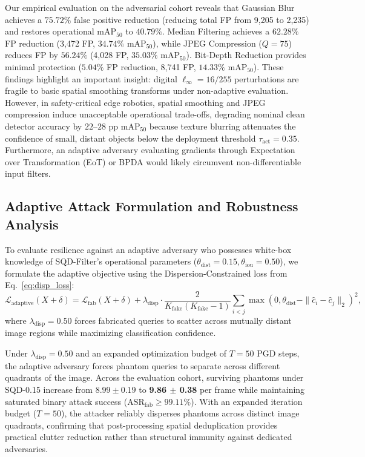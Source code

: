 \documentclass[preprint,12pt]{elsarticle}
\begin{document}
Our empirical evaluation on the adversarial cohort reveals that Gaussian Blur achieves a $75.72\%$ false positive reduction (reducing total FP from 9,205 to 2,235) and restores operational $\mathrm{mAP}_{50}$ to $40.79\%$. Median Filtering achieves a $62.28\%$ FP reduction (3,472 FP, $34.74\%$ $\mathrm{mAP}_{50}$), while JPEG Compression ($Q=75$) reduces FP by $56.24\%$ (4,028 FP, $35.03\%$ $\mathrm{mAP}_{50}$). Bit-Depth Reduction provides minimal protection ($5.04\%$ FP reduction, 8,741 FP, $14.33\%$ $\mathrm{mAP}_{50}$). These findings highlight an important insight: digital $\ell_\infty=16/255$ perturbations are fragile to basic spatial smoothing transforms under non-adaptive evaluation. However, in safety-critical edge robotics, spatial smoothing and JPEG compression induce unacceptable operational trade-offs, degrading nominal clean detector accuracy by $22\text{--}28\text{ pp}$ $\mathrm{mAP}_{50}$ because texture blurring attenuates the confidence of small, distant objects below the deployment threshold $\tau_{\mathrm{act}}=0.35$. Furthermore, an adaptive adversary evaluating gradients through Expectation over Transformation (EoT) \citep{athalye2018synthesizing} or BPDA \citep{athalye2018obfuscated} would likely circumvent non-differentiable input filters.

\subsection{Adaptive Attack Formulation and Robustness Analysis}
\label{sec:adaptive_attacks}
To evaluate resilience against an adaptive adversary who possesses white-box knowledge of SQD-Filter's operational parameters ($\theta_{\mathrm{dist}} = 0.15, \theta_{\mathrm{iou}} = 0.50$), we formulate the adaptive objective using the Dispersion-Constrained loss from Eq.~\eqref{eq:disp_loss}:
\begin{equation}
    \label{eq:adaptive_loss}
    \mathcal{L}_{\mathrm{adaptive}}(X + \delta) = \mathcal{L}_{\mathrm{fab}}(X + \delta) + \lambda_{\mathrm{disp}} \cdot \frac{2}{K_{\mathrm{fake}}(K_{\mathrm{fake}}-1)} \sum_{i < j} \max\left(0, \theta_{\mathrm{dist}} - \|\hat{c}_i - \hat{c}_j\|_2 \right)^2,
\end{equation}
where $\lambda_{\mathrm{disp}} = 0.50$ forces fabricated queries to scatter across mutually distant image regions while maximizing classification confidence.

Under $\lambda_{\mathrm{disp}} = 0.50$ and an expanded optimization budget of $T = 50$ PGD steps, the adaptive adversary forces phantom queries to separate across different quadrants of the image. Across the evaluation cohort, surviving phantoms under SQD-0.15 increase from $8.99 \pm 0.19$ to \textbf{9.86 $\pm$ 0.38} per frame while maintaining saturated binary attack success ($\mathrm{ASR}_{\mathrm{fab}} \ge 99.11\%$). With an expanded iteration budget ($T=50$), the attacker reliably disperses phantoms across distinct image quadrants, confirming that post-processing spatial deduplication provides practical clutter reduction rather than structural immunity against dedicated adversaries.
\end{document}
